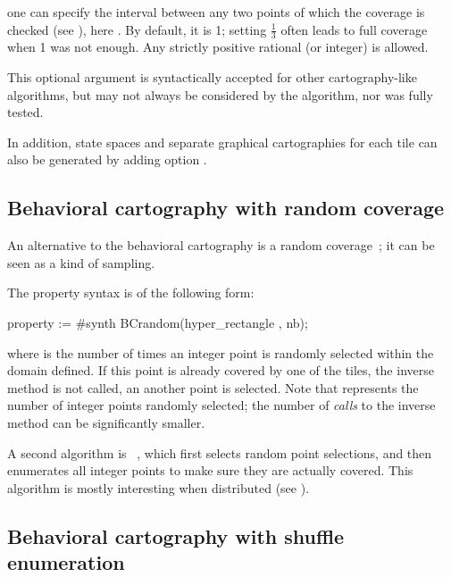 \noindent one can specify the interval between any two points of which the coverage is checked (see \cite{AF10}), here .
By default, it is 1; setting $\frac{1}{3}$ often leads to full coverage when 1 was not enough.
Any strictly positive rational (or integer) is allowed.

\begin{becareful}
	This optional argument is syntactically accepted for other cartography-like algorithms, but may not always be considered by the algorithm, nor was fully tested.
\end{becareful}

In addition, state spaces and separate graphical cartographies for each tile can also be generated by adding option .


\subsection*{Behavioral cartography with random coverage}\label{sss:mode:BC:random}

An alternative to the behavioral cartography is a random coverage~\cite{AF10}; it can be seen as a kind of sampling.

The property syntax is of the following form:

\begin{IMITATORproperty}
property := #synth BCrandom(hyper_rectangle , nb);
\end{IMITATORproperty}


\noindent{}where  is the number of times an integer point is randomly selected within the domain defined.
If this point is already covered by one of the tiles, the inverse method is not called, an another point is selected.
Note that  represents the number of integer points randomly selected; the number of \emph{calls} to the inverse method can be significantly smaller.

A second algorithm is ~\cite{ACE14}, which first selects random point selections, and then enumerates all integer points to make sure they are actually covered.
This algorithm is mostly interesting when distributed (see \cite{ACE14,ACN15}).


\subsection*{Behavioral cartography with shuffle enumeration}\label{sss:mode:BC:shuffle}

